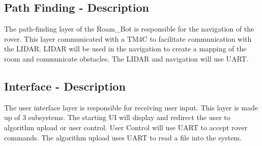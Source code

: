 \subsection{Path Finding - Description}
The path-finding layer of the Roam\_Bot is responsible for the navigation of the rover. This layer communicated with a TM4C to facilitate communication with the LIDAR. LIDAR will be used in the navigation to create a mapping of the room and communicate obstacles. The LIDAR and navigation will use UART.

\subsection{Interface - Description}
The user interface layer is responsible for receiving user input. This layer is made up of 3 subsystems. The starting UI will display and redirect the user to algorithm upload or user control. User Control will use UART to accept rover commands. The algorithm upload uses UART to read a file into the system. 